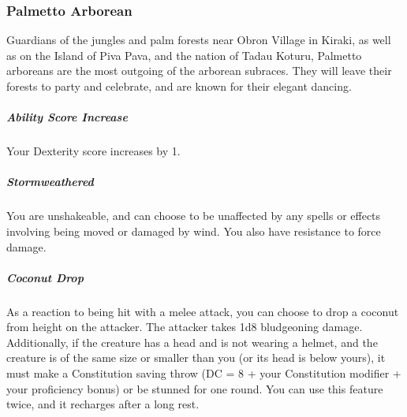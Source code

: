 \subsubsection{Palmetto Arborean}
Guardians of the jungles and palm forests near Obron Village in Kiraki, as well as on the Island of Piva Pava, and the nation of Tadau Koturu, Palmetto arboreans are the most outgoing of the arborean subraces. They will leave their forests to party and celebrate, and are known for their elegant dancing.
\subparagraph{Ability Score Increase}Your Dexterity score increases by 1.
\subparagraph{Stormweathered}You are unshakeable, and can choose to be unaffected by any spells or effects involving being moved or damaged by wind. You also have resistance to force damage.
\subparagraph{Coconut Drop}As a reaction to being hit with a melee attack, you can choose to drop a coconut from height on the attacker. The attacker takes 1d8 bludgeoning damage. Additionally, if the creature has a head and is not wearing a helmet, and the creature is of the same size or smaller than you (or its head is below yours), it must make a Constitution saving throw (DC = 8 + your Constitution modifier + your proficiency bonus) or be stunned for one round. You can use this feature twice, and it recharges after a long rest.

